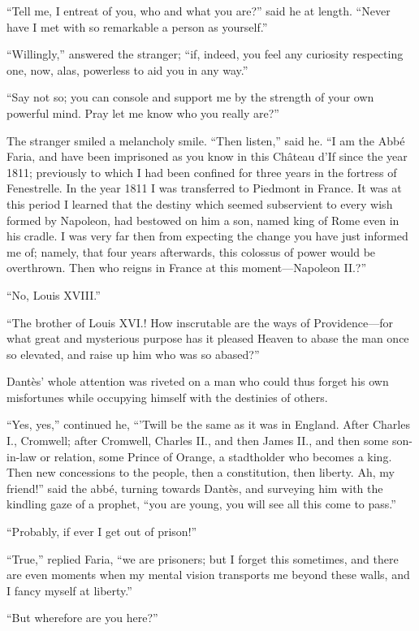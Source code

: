 “Tell me, I entreat of you, who and what you are?” said he at length.
“Never have I met with so remarkable a person as yourself.”

“Willingly,” answered the stranger; “if, indeed, you feel any curiosity
respecting one, now, alas, powerless to aid you in any way.”

“Say not so; you can console and support me by the strength of your own
powerful mind. Pray let me know who you really are?”

The stranger smiled a melancholy smile. “Then listen,” said he. “I am
the Abbé Faria, and have been imprisoned as you know in this Château
d’If since the year 1811; previously to which I had been confined for
three years in the fortress of Fenestrelle. In the year 1811 I was
transferred to Piedmont in France. It was at this period I learned that
the destiny which seemed subservient to every wish formed by Napoleon,
had bestowed on him a son, named king of Rome even in his cradle. I was
very far then from expecting the change you have just informed me of;
namely, that four years afterwards, this colossus of power would be
overthrown. Then who reigns in France at this moment—Napoleon II.?”

“No, Louis XVIII.”

“The brother of Louis XVI.! How inscrutable are the ways of
Providence—for what great and mysterious purpose has it pleased Heaven
to abase the man once so elevated, and raise up him who was so abased?”

Dantès’ whole attention was riveted on a man who could thus forget his
own misfortunes while occupying himself with the destinies of others.

“Yes, yes,” continued he, “’Twill be the same as it was in England.
After Charles I., Cromwell; after Cromwell, Charles II., and then James
II., and then some son-in-law or relation, some Prince of Orange, a
stadtholder who becomes a king. Then new concessions to the people,
then a constitution, then liberty. Ah, my friend!” said the abbé,
turning towards Dantès, and surveying him with the kindling gaze of a
prophet, “you are young, you will see all this come to pass.”

“Probably, if ever I get out of prison!”

“True,” replied Faria, “we are prisoners; but I forget this sometimes,
and there are even moments when my mental vision transports me beyond
these walls, and I fancy myself at liberty.”

“But wherefore are you here?”

